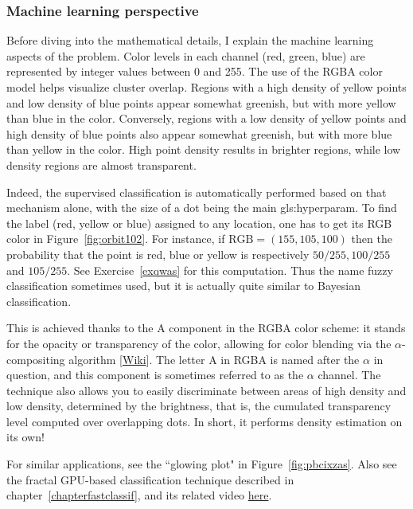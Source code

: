 \documentclass[oneside,10pt]{book}
\begin{document}
\subsubsection{Machine learning perspective}\label{rmlp}

Before diving into the mathematical details, I explain the machine learning aspects of the problem. Color levels in each channel (red, green, blue)  are represented by  integer values between 0 and 255. The use of the \textcolor{index}{RGBA} color model helps visualize cluster overlap. Regions with a high density of yellow points and low density of blue points appear somewhat greenish, but with more yellow than blue in the color. Conversely, regions with a low density of yellow points and high density of blue points also appear somewhat greenish, but with more blue than yellow in the color. High point density results in
brighter regions, while low density regions are almost transparent. 

Indeed, the supervised classification is automatically performed based on that mechanism alone, 
with the size of a dot being the main \gls{gls:hyperparam}. To find the label (red, yellow or blue) assigned to any location, one has to get its RGB color in Figure~\ref{fig:orbit102}. 
For instance, if $\text{RGB} = (155, 105, 100)$ then the probability that the point is red, blue or yellow is respectively 
$50/255, 100/255$ and $105/255$. See Exercise~\ref{exqwas} for this computation. Thus the name fuzzy classification sometimes used, but it is actually quite similar to Bayesian classification. 

This is achieved thanks to the A component in the RGBA color scheme: it stands for the opacity or transparency of the color, allowing for color blending via the \textcolor{index}{$\alpha$-compositing} algorithm [\href{https://en.wikipedia.org/wiki/Alpha_compositing}{Wiki}]. The letter A in RGBA is named after the $\alpha$ in question, and this component is sometimes referred to as the $\alpha$ channel. The technique also allows you to easily discriminate between areas of high density and low density, determined by the brightness, that is, the cumulated transparency level computed over overlapping dots. In short, it performs density estimation on its own!  

For similar applications, see the ``glowing plot" in  Figure~\ref{fig:pbcixzas}. Also see the fractal GPU-based classification technique 
described in chapter~\ref{chapterfastclassif}, and its related video \href{https://mltechniques.com/2022/03/31/very-deep-neural-networks-explained-in-40-seconds/}{here}.
\end{document}
